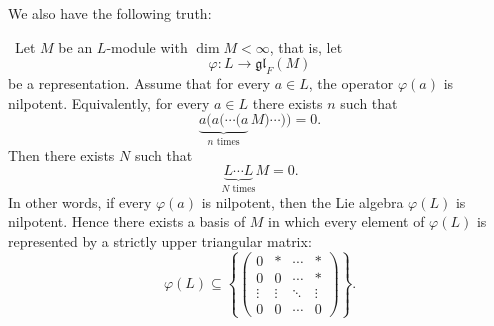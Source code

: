 We also have the following truth:

\begin{corollary}
    \ Let $M$ be an $L$-module with $\dim M<\infty$, that is, let
    \[
        \varphi:L\to \mathfrak{gl}_F(M)
    \]
    be a representation. Assume that for every $a\in L$, the operator $\varphi(a)$ is nilpotent. Equivalently, for every $a\in L$ there exists $n$ such that
    \[
        \underbrace{a\bigl(a(\cdots(a}_{n\text{ times}}\,M)\cdots)\bigr)=0.
    \]
    Then there exists $N$ such that
    \[
        \underbrace{L\cdots L}_{N\text{ times}}M=0.
    \]
    In other words, if every $\varphi(a)$ is nilpotent, then the Lie algebra $\varphi(L)$ is nilpotent. Hence there exists a basis of $M$ in which every element of $\varphi(L)$ is represented by a strictly upper triangular matrix:
    \[
        \varphi(L)\subseteq
        \left\{
        \begin{pmatrix}
            0      & *      & \cdots & *      \\
            0      & 0      & \cdots & *      \\
            \vdots & \vdots & \ddots & \vdots \\
            0      & 0      & \cdots & 0
        \end{pmatrix}
        \right\}.
    \]
\end{corollary}

